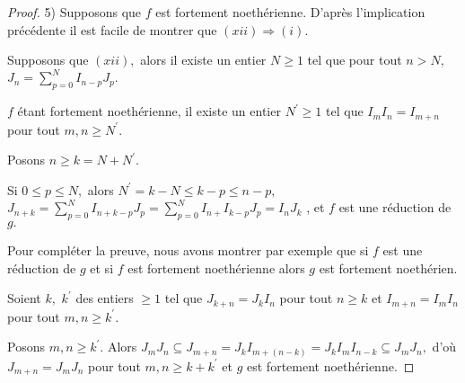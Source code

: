 \begin{proof}
	5) Supposons que $f$ est fortement noethérienne. D'après
	l'implication précédente il est facile de montrer que $(xii)\Longrightarrow (i).$
	
	Supposons que $(xii),$ alors il existe un entier $N\geq 1$ tel que pour tout $n>N,$ $J_{n}=\sum\limits_{p=0}^{N}I_{n-p}J_{p}.$
	
	$f$ étant fortement noethérienne, il existe un entier $N^{\prime}\geq 1$ tel que $I_{m}I_{n}=I_{m+n}$ pour tout $m,n\geq N^{\prime }.$
	
	Posons $n\geq k=N+N^{\prime }.$
	
	Si $0\leq p\leq N,$ alors $N^{\prime }=k-N\leq k-p\leq n-p,$ $J_{n+k}=\sum\limits_{p=0}^{N}I_{n+k-p}J_{p}=\sum\limits_{p=0}^{N}I_{n+}I_{k-p}J_{p}=I_{n}J_{k}$ , et $f$ est une réduction de $g.$
	
	Pour compléter la preuve, nous avons montrer par exemple que si $f$ est une réduction de $g$ et si $f$ est fortement noethérienne alors $g$ est fortement noethérien.
	
	Soient $k,$ $k^{\prime }$ des entiers $\geq 1$ tel que $J_{k+n}=J_{k}I_{n}$
	pour tout $n\geq k$ et $I_{m+n}=I_{m}I_{n}$ pour tout $m,n\geq k^{\prime }.$
	
	Posons $m,n\geq k^{\prime }.$ Alors $J_{m}J_{n}\subseteq
	J_{m+n}=J_{k}I_{m+(n-k)}=J_{k}I_{m}I_{n-k}\subseteq J_{m}J_{n},$ d'où $J_{m+n}=J_{m}J_{n}$ pour tout $m,n\geq k+k^{\prime }$ et $g$ est fortement noethérienne.
\end{proof}